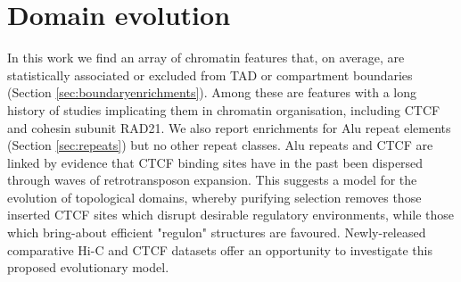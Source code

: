 \documentclass[a4paper,11pt,oneside]{book}
\begin{document}
\section{Domain evolution}

In this work we find an array of chromatin features that, on average, are statistically associated or excluded from TAD or compartment boundaries (Section \ref{sec:boundaryenrichments}). Among these are features with a long history of studies implicating them in chromatin organisation, including CTCF and cohesin subunit RAD21. We also report enrichments for Alu repeat elements (Section \ref{sec:repeats}) but no other repeat classes. Alu repeats and CTCF are linked by evidence that CTCF binding sites have in the past been dispersed through waves of retrotransposon expansion.\cite{Schmidt2012, Nikolaev2009} This suggests a model for the evolution of topological domains, whereby purifying selection removes those inserted CTCF sites which disrupt desirable regulatory environments, while those which bring-about efficient "regulon" structures are favoured. Newly-released comparative Hi-C and CTCF datasets\cite{VietriRudan2015} offer an opportunity to investigate this proposed evolutionary model. 


\end{document}
